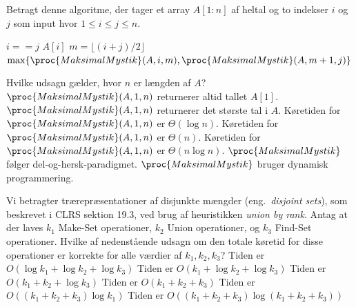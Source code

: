 \mulighederslut
{}



Betragt denne algoritme, der tager et array $A[1:n]$ af heltal og to indekser $i$ og $j$ som input hvor $1\leq i \leq j \leq n$.

\begin{codebox}
  \li \If $i==j$ \Do
  \li \Return $A[i]$ \End
  \li $m=\lfloor (i+j)/2\rfloor$
  \li \Return $\max\{\proc{MaksimalMystik}(A,i,m),\proc{MaksimalMystik}(A,m+1,j)\}$
\end{codebox}

\noindent
Hvilke udsagn gælder, hvor $n$ er længden af $A$?
\fleresvar
\mulighederstart
\svar $\proc{MaksimalMystik}(A,1,n)$ returnerer altid tallet $A[1]$.
\svar $\proc{MaksimalMystik}(A,1,n)$ returnerer det største tal i $A$. \korrekt
\svar Køretiden for $\proc{MaksimalMystik}(A,1,n)$ er $\Theta(\log n)$.
\svar Køretiden for $\proc{MaksimalMystik}(A,1,n)$ er $\Theta(n)$. \korrekt
\svar Køretiden for $\proc{MaksimalMystik}(A,1,n)$ er $\Theta(n \log n)$.
\svar $\proc{MaksimalMystik}$ følger del-og-hersk-paradigmet.\korrekt
\svar $\proc{MaksimalMystik}$ bruger dynamisk programmering.

\mulighederslut
{}




Vi betragter trærepræsentationer af disjunkte mængder (eng.~\emph{disjoint sets}), som beskrevet i CLRS sektion 19.3, ved brug af heuristikken \emph{union by rank}.
Antag at der laves $k_1$ {\sc Make-Set} operationer, $k_2$ {\sc Union} operationer, og $k_3$ {\sc Find-Set} operationer.
Hvilke af nedenstående udsagn om den totale køretid for disse operationer er korrekte for alle værdier af $k_1,k_2,k_3$?
\fleresvar
\mulighederstart
\svar Tiden er $O(\log k_1 + \log k_2 + \log k_3)$
\svar Tiden er $O(k_1 + \log k_2 + \log k_3)$
\svar Tiden er $O(k_1 + k_2 + \log k_3)$
\svar Tiden er $O(k_1 + k_2 + k_3)$
\svar Tiden er $O((k_1 + k_2 + k_3)\log k_1)$ \korrekt
\svar Tiden er $O((k_1 + k_2 + k_3)\log (k_1 + k_2 + k_3))$ \korrekt
\mulighederslut
{}




